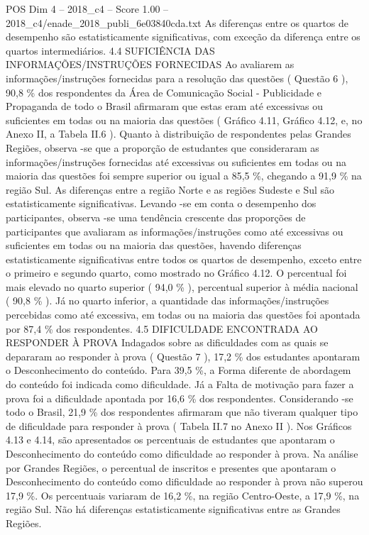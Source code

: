 \begin{textsample}{POS Dim 4 – 2018\_c4 – Score 1.00 – 2018\_c4/enade\_2018\_publi\_6e03840cda.txt}
As diferenças entre os quartos de desempenho são estatisticamente significativas, com exceção da diferença entre os quartos intermediários. 4.4 SUFICIÊNCIA DAS INFORMAÇÕES/INSTRUÇÕES FORNECIDAS Ao avaliarem as informações/instruções fornecidas para a resolução das questões ( Questão 6 ), 90,8 \% dos respondentes da Área de Comunicação Social - Publicidade e Propaganda de todo o Brasil afirmaram que estas eram até excessivas ou suficientes em todas ou na maioria das questões ( Gráfico 4.11, Gráfico 4.12, e, no Anexo II, a Tabela II.6 ).
Quanto à distribuição de respondentes pelas Grandes Regiões, observa -se que a proporção de estudantes que consideraram as informações/instruções fornecidas até excessivas ou suficientes em todas ou na maioria das questões foi sempre superior ou igual a 85,5 \%, chegando a 91,9 \% na região Sul.
As diferenças entre a região Norte e as regiões Sudeste e Sul são estatisticamente significativas.
Levando -se em conta o desempenho dos participantes, observa -se uma tendência crescente das proporções de participantes que avaliaram as informações/instruções como até excessivas ou suficientes em todas ou na maioria das questões, havendo diferenças estatisticamente significativas entre todos os quartos de desempenho, exceto entre o primeiro e segundo quarto, como mostrado no Gráfico 4.12.
O percentual foi mais elevado no quarto superior ( 94,0 \% ), percentual superior à média nacional ( 90,8 \% ).
Já no quarto inferior, a quantidade das informações/instruções percebidas como até excessiva, em todas ou na maioria das questões foi apontada por 87,4 \% dos respondentes. 4.5 DIFICULDADE ENCONTRADA AO RESPONDER À PROVA Indagados sobre as dificuldades com as quais se depararam ao responder à prova ( Questão 7 ), 17,2 \% dos estudantes apontaram o Desconhecimento do conteúdo.
Para 39,5 \%, a Forma diferente de abordagem do conteúdo foi indicada como dificuldade.
Já a Falta de motivação para fazer a prova foi a dificuldade apontada por 16,6 \% dos respondentes.
Considerando -se todo o Brasil, 21,9 \% dos respondentes afirmaram que não tiveram qualquer tipo de dificuldade para responder à prova ( Tabela II.7 no Anexo II ).
Nos Gráficos 4.13 e 4.14, são apresentados os percentuais de estudantes que apontaram o Desconhecimento do conteúdo como dificuldade ao responder à prova.
Na análise por Grandes Regiões, o percentual de inscritos e presentes que apontaram o Desconhecimento do conteúdo como dificuldade ao responder à prova não superou 17,9 \%.
Os percentuais variaram de 16,2 \%, na região Centro-Oeste, a 17,9 \%, na região Sul.
Não há diferenças estatisticamente significativas entre as Grandes Regiões.

\end{textsample}
